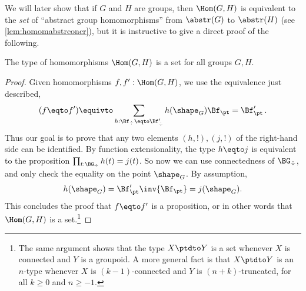 We will later show that if $G$ and $H$ are groups, then $\Hom(G,H)$
is equivalent to the \emph{set} of ``abstract group homomorphisms''
from $\abstr(G)$ to $\abstr(H)$ (see \cref{lem:homomabstrconcr}),
but it is instructive to give a direct proof of the following.
\begin{lemma}\label{lem:hom-is-set}
  The type of homomorphisms $\Hom(G,H)$
  is a set for all groups $G,H$.
\end{lemma}
\begin{proof}
  Given homomorphisms $f,f':\Hom(G,H)$, we use the equivalence just
  described,
  \[
    (f \eqto f') \equivto \sum_{h:\Bf_\div\eqto\Bf'_\div}
    h(\shape_G)\Bf_\pt = \Bf'_\pt \,.
  \]
  Thus our goal is to prove that any two elements $(h,!),(j,!)$ 
  of the right-hand side can be identified.
  By function extensionality, the type $h\eqto j$ is equivalent to
  the proposition $\prod_{t:\BG_\div} h(t) = j(t)$. So now we can use
  connectedness of $\BG_\div$, and
  only check the equality on the point $\shape_G$. By assumption,
  \begin{displaymath}
    h(\shape_G) = \Bf'_\pt \inv{\Bf_\pt} = j(\shape_G).
  \end{displaymath}
  This concludes the proof that $f\eqto f'$ is a proposition, or in other
  words that $\Hom(G,H)$ is a set.\footnote{%
    The same argument shows that the type $X\ptdto Y$ is a set
    whenever $X$ is connected and $Y$ is a groupoid.
    A more general fact is that $X \ptdto Y$ is an $n$-type
    whenever $X$ is $(k-1)$-connected and $Y$ is $(n+k)$-truncated,
    for all $k\ge0$ and $n\ge-1$.}
\end{proof}

